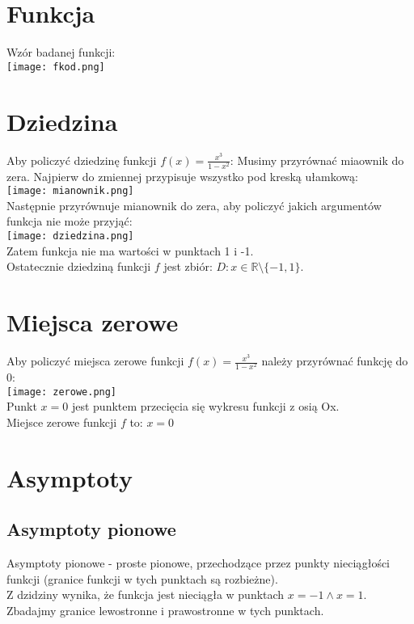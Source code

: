 \documentclass[a4paper,10pt]{article}
\begin{document}
\section{Funkcja}
Wzór badanej funkcji: \\
\texttt{[image: fkod.png]}

\section{Dziedzina}
Aby policzyć dziedzinę funkcji $ f(x)=\frac{x^3}{1-x^2} $:
Musimy przyrównać miaownik do zera. Najpierw do zmiennej przypisuje wszystko pod kreską ułamkową:\\
\texttt{[image: mianownik.png]}\\
Następnie przyrównuje mianownik do zera, aby policzyć jakich argumentów funkcja nie może przyjąć:\\
\texttt{[image: dziedzina.png]}\\
Zatem funkcja nie ma wartości w punktach 1 i -1. \\


Ostatecznie dziedziną funkcji $f$ jest zbiór:
 $ D: x \in \mathbb{R} \setminus \{ -1,1 \} $.

\section{Miejsca zerowe}
Aby policzyć miejsca zerowe funkcji $ f(x)=\frac{x^3}{1-x^2} $ należy przyrównać funkcję do 0:\\
\texttt{[image: zerowe.png]}\\
Punkt $x=0$ jest punktem przecięcia się wykresu funkcji z osią Ox.\\


Miejsce zerowe funkcji $f$ to: $x=0$


\section{Asymptoty}

\subsection{Asymptoty pionowe}
Asymptoty pionowe - proste pionowe, przechodzące przez punkty nieciągłości funkcji (granice funkcji w tych punktach są rozbieżne).\\
Z dzidziny wynika, że funkcja jest nieciągła w punktach $x=-1 \land x=1$. Zbadajmy granice lewostronne i prawostronne w tych punktach.\\
\end{document}
